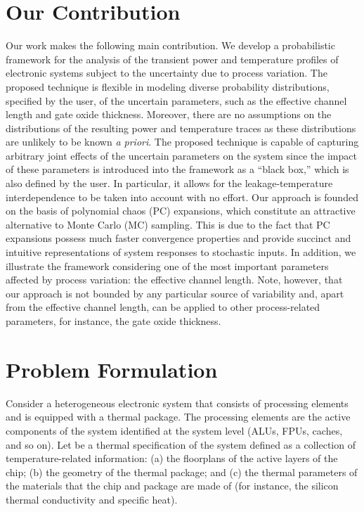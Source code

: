 \section{Our Contribution}

Our work makes the following main contribution. We develop a probabilistic
framework for the analysis of the transient power and temperature profiles of
electronic systems subject to the uncertainty due to process variation. The
proposed technique is flexible in modeling diverse probability distributions,
specified by the user, of the uncertain parameters, such as the effective
channel length and gate oxide thickness. Moreover, there are no assumptions on
the distributions of the resulting power and temperature traces as these
distributions are unlikely to be known \emph{a priori}. The proposed technique
is capable of capturing arbitrary joint effects of the uncertain parameters on
the system since the impact of these parameters is introduced into the framework
as a ``black box,'' which is also defined by the user. In particular, it allows
for the leakage-temperature interdependence to be taken into account with no
effort. Our approach is founded on the basis of polynomial chaos (PC)
expansions, which constitute an attractive alternative to Monte Carlo (MC)
sampling. This is due to the fact that PC expansions possess much faster
convergence properties and provide succinct and intuitive representations of
system responses to stochastic inputs. In addition, we illustrate the framework
considering one of the most important parameters affected by process variation:
the effective channel length. Note, however, that our approach is not bounded by
any particular source of variability and, apart from the effective channel
length, can be applied to other process-related parameters, for instance, the
gate oxide thickness.

\section{Problem Formulation}

Consider a heterogeneous electronic system that consists of \np processing
elements and is equipped with a thermal package. The processing elements are the
active components of the system identified at the system level (ALUs, FPUs,
caches, and so on). Let \spec be a thermal specification of the system defined
as a collection of temperature-related information: (a) the floorplans of the
active layers of the chip; (b) the geometry of the thermal package; and (c) the
thermal parameters of the materials that the chip and package are made of (for
instance, the silicon thermal conductivity and specific heat).

